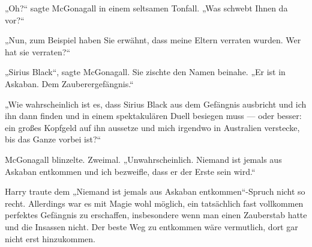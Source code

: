 „Oh?“ sagte McGonagall in einem seltsamen Tonfall.
„Was schwebt Ihnen da vor?“

„Nun, zum Beispiel haben Sie erwähnt, dass meine Eltern verraten wurden. Wer hat sie verraten?“

„Sirius Black“, sagte McGonagall. Sie zischte den Namen beinahe.
„Er ist in Askaban. Dem Zauberergefängnis.“

„Wie wahrscheinlich ist es, dass Sirius Black aus dem Gefängnis ausbricht und ich ihn dann finden und in einem spektakulären Duell besiegen muss — oder besser: ein großes Kopfgeld auf ihn aussetze und mich irgendwo in Australien verstecke, bis das Ganze vorbei ist?“

McGonagall blinzelte. Zweimal.
„Unwahrscheinlich. Niemand ist jemals aus Askaban entkommen und ich bezweifle, dass er der Erste sein wird.“

Harry traute dem
„Niemand ist jemals aus Askaban entkommen“-Spruch nicht so recht. Allerdings war es mit Magie wohl möglich, ein tatsächlich fast vollkommen perfektes Gefängnis zu erschaffen, insbesondere wenn man einen Zauberstab hatte und die Insassen nicht. Der beste Weg zu entkommen wäre vermutlich, dort gar nicht erst hinzukommen.

